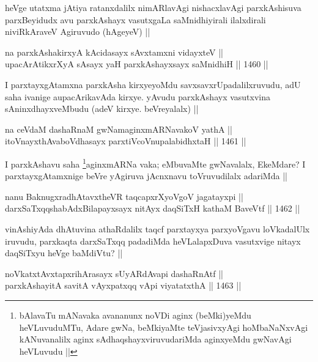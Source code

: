 \begin{artha}
heVge utatxma jAtiya ratanxdalilx nimARlavAgi nishacxlavAgi parxkAshisuva parxBeyidudx avu parxkAshayx vasutxgaLa saMnidhiyirali ilalxdirali niviRkAraveV Agiruvudo (hAgeyeV) ||
\end{artha}

\begin{shl}
na parxkAshakirxyA kAcidasayx sAvxtamxni vidayxteV || \\
upacArAtikxrXyA sA\s sayx yaH parxkAshayxsayx saMnidhiH ||  1460 ||  
\end{shl}

\begin{artha}
I parxtayxgAtamxna parxkAsha kirxyeyoMdu savxsavxrUpadalilxruvudu, adU saha ivanige aupacArikavAda kirxye. yAvudu parxkAshayx vasutxvina sAninxdhayxveMbudu (adeV kirxye. beVreyalalx) ||
\end{artha}

\begin{shl}
na ceVdaM dashaRnaM gwNamaginxmARNavakoV yathA || \\
itoV\s nayxthA\s vaboVdhasayx parxtiVcoV\s nupalabidhxtaH ||  1461 ||  
\end{shl}

\begin{artha}
I parxkAshavu saha \footnote{bAlavaTu mANavaka avananunx noVDi aginx (beMki)yeMdu heVLuvuduMTu, Adare gwNa, beMkiyaMte teVjasivxyAgi hoMbaNaNxvAgi kANuvanalilx aginx sAdhaqshayxviruvudariMda aginxyeMdu gwNavAgi heVLuvudu ||}aginxmARNa vaka; eMbuvaMte gwNavalalx, EkeMdare? I parxtayxgAtamxnige beVre yAgiruva jAcnxnavu toVruvudilalx adariMda ||
\end{artha}


\begin{shl}
nanu BaknugxradhAtavxtheVR taqcapxrXyoVgoV jagatayxpi || \\
darxSaTxqqshabAdxBilapayxsayx nitAyx daqSiTxH kathaM BaveVtf ||  1462 ||  
\end{shl}

\begin{artha}
vinAshiyAda dhAtuvina athaRdalilx taqcf parxtayxya parxyoVgavu loVkadalUlx iruvudu, parxkaqta darxSaTxqq padadiMda heVLalapxDuva vasutxvige nitayx daqSiTxyu heVge baMdiVtu? ||
\end{artha}


\begin{shl}
noVkatxtAvxtapxrihArasayx sUyARdAvapi dashaRnAtf || \\
parxkAshayitA savitA vAyxpatxqq vA\s pi viyatatxthA ||  1463 ||  
\end{shl}

